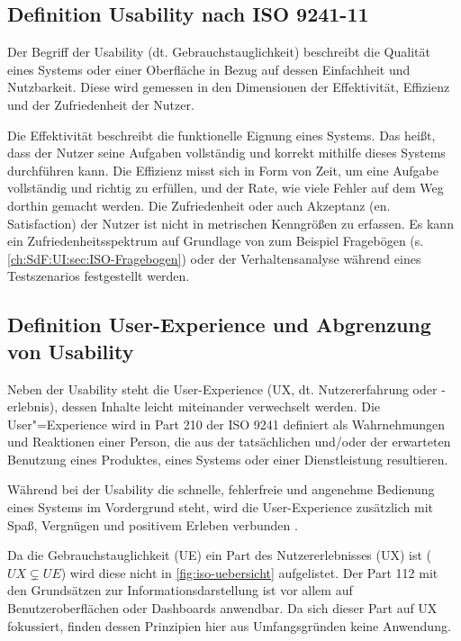 \subsection{Definition Usability nach ISO 9241-11}
\label{ch:SdF:UI:sec:Usability}
Der Begriff der Usability (dt. Gebrauchstauglichkeit) beschreibt die Qualität eines Systems oder einer Oberfläche in Bezug auf dessen Einfachheit und Nutzbarkeit. Diese wird gemessen in den Dimensionen der Effektivität, Effizienz und der Zufriedenheit der Nutzer.

Die Effektivität beschreibt die funktionelle Eignung eines Systems. Das heißt, dass der Nutzer seine Aufgaben vollständig und korrekt mithilfe dieses Systems durchführen kann. Die Effizienz misst sich in Form von Zeit, um eine Aufgabe vollständig und richtig zu erfüllen, und der Rate, wie viele Fehler auf dem Weg dorthin gemacht werden. Die Zufriedenheit oder auch Akzeptanz (en. Satisfaction) \cite[S. 23]{Vollrath:2015:Taschenbuch} der Nutzer ist nicht in metrischen Kenngrößen zu erfassen. Es kann ein Zufriedenheitsspektrum auf Grundlage von zum Beispiel Fragebögen (s. \autoref{ch:SdF:UI:sec:ISO-Fragebogen}) oder der Verhaltensanalyse während eines Testszenarios festgestellt werden. \cite[Zusammenfassung nach][]{DIN_EN_ISO_9241-110}

\subsection{Definition User-Experience und Abgrenzung von Usability}
\label{ch:SdF:UI:sec:Usability_vs_User_Experience}
Neben der Usability steht die User-Experience (UX, dt. Nutzererfahrung oder -erlebnis), dessen Inhalte leicht miteinander verwechselt werden. Die User"=Experience wird in Part 210 der ISO 9241 definiert als \glqq Wahrnehmungen und Reaktionen einer Person, die aus der tatsächlichen und/oder der erwarteten Benutzung eines Produktes, eines Systems oder einer Dienstleistung resultieren.\grqq{} \cite[S. 7]{DIN_EN_ISO_9241-210:2011}

Während bei der Usability die schnelle, fehlerfreie und angenehme Bedienung eines Systems im Vordergrund steht, wird die User-Experience zusätzlich mit Spaß, Vergnügen und positivem Erleben verbunden \cite[S. 23\psq]{Vollrath:2015:Taschenbuch}.

Da die Gebrauchstauglichkeit (UE) ein Part des Nutzererlebnisses (UX) ist ($UX \varsubsetneq UE$) \cite[S. 14]{usability_vs_experience:2018} wird diese nicht in \autoref{fig:iso-uebersicht} aufgelistet. Der Part 112 mit den Grundsätzen zur Informationsdarstellung ist vor allem auf Benutzeroberflächen oder Dash\-boards anwendbar. Da sich dieser Part auf UX fokussiert, finden dessen Prinzipien hier aus Umfangsgründen keine Anwendung.

